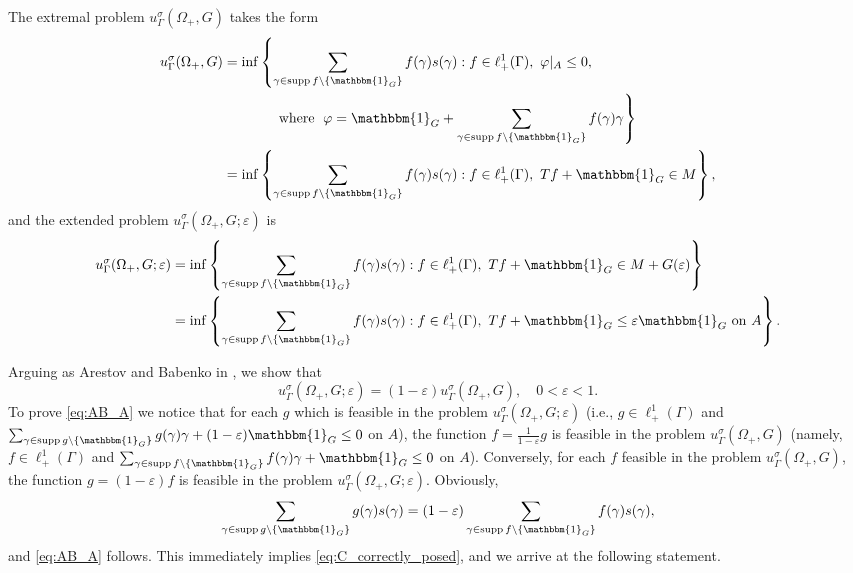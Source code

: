\documentclass[[a4paper,english,12pt]{amsart}
\theoremstyle{plain}
\theoremstyle{remark}
\newcommand\supp{\operatorname{supp}}
\begin{document}
The extremal problem $u_\Gamma^{\sigma}(\Omega_+, G)$ takes the form
\begin{align*}
u_\Gamma^{\sigma}(\Omega_+, G)  & =  \inf \left\{ \sum_{\gamma \in  \supp{f} \setminus \{\mathbbm{1}_G\}} f(\gamma) s(\gamma) : \right.   f \in \ell^1_+(\Gamma), \
\varphi|_A \le 0, \\ 
& \qquad\qquad\text{where }\left. \varphi = \mathbbm{1}_G + \sum_{\gamma \in  \supp{f} \setminus \{\mathbbm{1}_G\}} f(\gamma) \gamma
\right\} \\
& = \inf \left\{ \sum_{\gamma \in  \supp{f} \setminus \{\mathbbm{1}_G\}} f(\gamma) s(\gamma) : f \in \ell^1_+(\Gamma),  \ Tf + \mathbbm{1}_G \in M  \right\},
\end{align*}
and the extended problem $u_\Gamma^{\sigma}(\Omega_+, G;\varepsilon)$ is
\begin{align*}
u_\Gamma^{\sigma}(\Omega_+, G;\varepsilon) & = \inf \left\{ \sum_{\gamma \in  \supp{f} \setminus \{\mathbbm{1}_G\}} f(\gamma) s(\gamma) : f \in \ell^1_+(\Gamma), \
Tf + \mathbbm{1}_{G} \in M + G(\varepsilon)   \right\} \\
& = \inf \left\{ \sum_{\gamma \in  \supp{f} \setminus \{\mathbbm{1}_G\}} f(\gamma) s(\gamma) : f \in \ell^1_+(\Gamma), \
Tf + \mathbbm{1}_G \le \varepsilon \mathbbm{1}_{G} \ \text{on} \ A   \right\}.
\end{align*}

Arguing as Arestov and Babenko in \cite{AB}, we show that
\begin{equation} \label{eq:AB_A}
u_\Gamma^{\sigma}(\Omega_+, G;\varepsilon) = (1 - \varepsilon) u_\Gamma^{\sigma}(\Omega_+, G), \quad 0 < \varepsilon < 1.
\end{equation}
To prove \eqref{eq:AB_A} we notice that for each $g$ which is feasible in the problem $u_\Gamma^{\sigma}(\Omega_+, G;\varepsilon)$ (i.e., $g \in \ell^1_+(\Gamma)$ and $\sum_{\gamma \in \supp{g} \setminus \{\mathbbm{1}_G\}} g(\gamma) \gamma + (1 - \varepsilon) \mathbbm{1}_G \le 0$ on $A$),  the function $f = \frac{1}{1 - \varepsilon} g$ is feasible in the problem $u_\Gamma^{\sigma}(\Omega_+, G)$ (namely, $f \in \ell^1_+(\Gamma)$ and $\sum_{\gamma \in  \supp{f} \setminus \{\mathbbm{1}_G\}} f(\gamma) \gamma + \mathbbm{1}_G \le 0$ on $A$). Conversely, for each $f$ feasible in the problem $u_\Gamma^{\sigma}(\Omega_+, G)$, the function $g = (1 - \varepsilon) f$ is feasible in the problem $u_\Gamma^{\sigma}(\Omega_+, G;\varepsilon)$. Obviously,
$$
\sum_{\gamma \in \supp{g} \setminus \{\mathbbm{1}_G\}} g(\gamma) s(\gamma) = (1 - \varepsilon) \sum_{\gamma \in  \supp{f} \setminus \{\mathbbm{1}_G\}} f(\gamma) s(\gamma),
$$
and \eqref{eq:AB_A} follows. This immediately implies \eqref{eq:C_correctly_posed}, and we arrive at the following statement.
\end{document}
